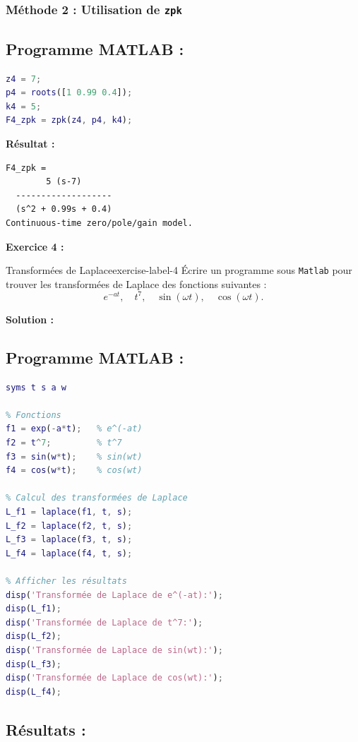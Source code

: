 \documentclass{article}
\begin{document}
\subsubsection*{Méthode 2 : Utilisation de \texttt{zpk}}
\subsection*{Programme MATLAB :}
\begin{lstlisting}[language=Matlab]
% F4(p)
z4 = 7;
p4 = roots([1 0.99 0.4]); 
k4 = 5; 
F4_zpk = zpk(z4, p4, k4);
\end{lstlisting}

\textbf{Résultat :}
\begin{verbatim}
F4_zpk =
        5 (s-7)
  -------------------
  (s^2 + 0.99s + 0.4)
Continuous-time zero/pole/gain model.
\end{verbatim}



\newpage

\textsf{\textbf{Exercice 4 :}}
\begin{problem}{Transform\'ees de Laplace}{exercise-label-4}
\'Ecrire un programme sous \texttt{Matlab} pour trouver les transform\'ees de Laplace des fonctions suivantes :
\[
e^{-at}, \quad t^7, \quad \sin(\omega t), \quad \cos(\omega t).
\]
\end{problem}

\textsf{\textbf{Solution :}}

\subsection*{Programme MATLAB :}
\begin{lstlisting}[language=Matlab]
% Définir les variables symboliques
syms t s a w

% Fonctions
f1 = exp(-a*t);   % e^(-at)
f2 = t^7;         % t^7
f3 = sin(w*t);    % sin(wt)
f4 = cos(w*t);    % cos(wt)

% Calcul des transformées de Laplace
L_f1 = laplace(f1, t, s); 
L_f2 = laplace(f2, t, s); 
L_f3 = laplace(f3, t, s); 
L_f4 = laplace(f4, t, s); 

% Afficher les résultats
disp('Transformée de Laplace de e^(-at):');
disp(L_f1);
disp('Transformée de Laplace de t^7:');
disp(L_f2);
disp('Transformée de Laplace de sin(wt):');
disp(L_f3);
disp('Transformée de Laplace de cos(wt):');
disp(L_f4);
\end{lstlisting}

\newpage
\subsection*{Résultats :}
\end{document}
